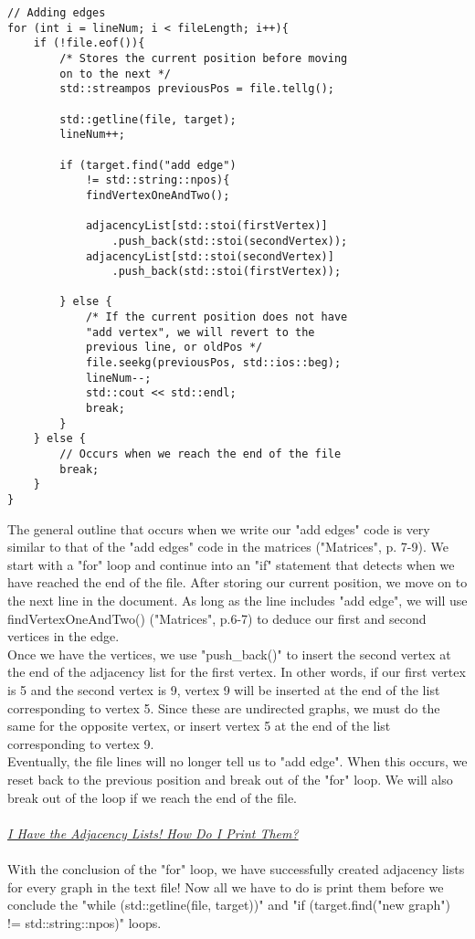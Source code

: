 \documentclass{article}
\begin{document}
\begin{lstlisting}
// Adding edges
for (int i = lineNum; i < fileLength; i++){
    if (!file.eof()){
        /* Stores the current position before moving 
        on to the next */
        std::streampos previousPos = file.tellg();

        std::getline(file, target);
        lineNum++;

        if (target.find("add edge") 
            != std::string::npos){
            findVertexOneAndTwo();

            adjacencyList[std::stoi(firstVertex)]
                .push_back(std::stoi(secondVertex));
            adjacencyList[std::stoi(secondVertex)]
                .push_back(std::stoi(firstVertex));

        } else {
            /* If the current position does not have 
            "add vertex", we will revert to the 
            previous line, or oldPos */
            file.seekg(previousPos, std::ios::beg);
            lineNum--;
            std::cout << std::endl;
            break;
        }
    } else {
        // Occurs when we reach the end of the file
        break;
    }
}
\end{lstlisting}
The general outline that occurs when we write our "add edges" code is very similar to that of the "add edges" code in the matrices ("Matrices", p. 7-9). We start with a "for" loop and continue into an "if" statement that detects when we have reached the end of the file. After storing our current position, we move on to the next line in the document. As long as the line includes "add edge", we will use findVertexOneAndTwo() ("Matrices", p.6-7) to deduce our first and second vertices in the edge. \\
Once we have the vertices, we use "push\_back()" to insert the second vertex at the end of the adjacency list for the first vertex. In other words, if our first vertex is 5 and the second vertex is 9, vertex 9 will be inserted at the end of the list corresponding to vertex 5. Since these are undirected graphs, we must do the same for the opposite vertex, or insert vertex 5 at the end of the list corresponding to vertex 9. \\
Eventually, the file lines will no longer tell us to "add edge". When this occurs, we reset back to the previous position and break out of the "for" loop. We will also break out of the loop if we reach the end of the file. \\ \\
\underline{\textit{I Have the Adjacency Lists! How Do I Print Them?}} \\ \\
With the conclusion of the "for" loop, we have successfully created adjacency lists for every graph in the text file! Now all we have to do is print them before we conclude the "while (std::getline(file, target))" and "if (target.find("new graph") != std::string::npos)" loops.
\end{document}
